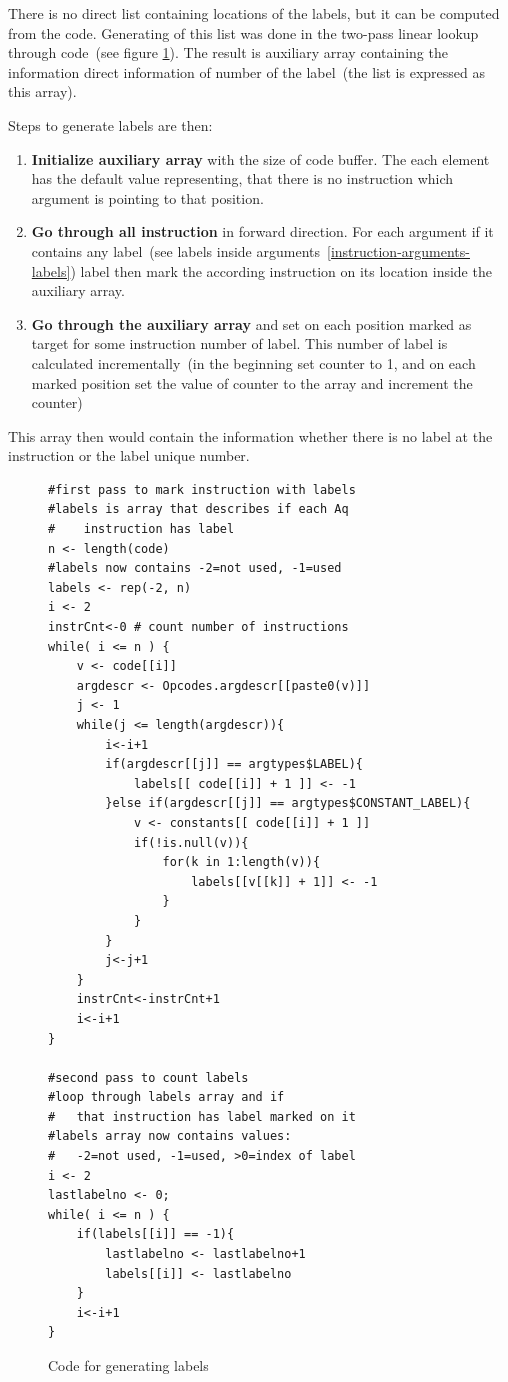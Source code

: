 \documentclass[thesis=M,english]{FITthesis}[2018/10/20]
\begin{document}
There is no direct list containing locations of the labels, but it can be computed from the code. Generating of this list was done in the two-pass linear lookup through code~(see figure \ref{fig:code-generating-labels}). The result is auxiliary array containing the information direct information of number of the label~(the list is expressed as this array).

Steps to generate labels are then:
\begin{enumerate}
	\item \textbf{Initialize auxiliary array} with the size of code buffer. The each element has the default value representing, that there is no instruction which argument is pointing to that position.
	\item \textbf{Go through all instruction} in forward direction. For each argument if it contains any label~(see labels inside arguments~\ref{instruction-arguments-labels}) label then mark the according instruction on its location inside the auxiliary array.
	\item \textbf{Go through the auxiliary array} and set on each position marked as target for some instruction number of label. This number of label is calculated incrementally~(in the beginning set counter to 1, and on each marked position set the value of counter to the array and increment the counter)
\end{enumerate}

This array then would contain the information whether there is no label at the instruction or the label unique number.

\begin{figure}[!h]
\begin{lstlisting}
#first pass to mark instruction with labels
#labels is array that describes if each	Aq
#    instruction has label
n <- length(code)
#labels now contains -2=not used, -1=used
labels <- rep(-2, n)
i <- 2
instrCnt<-0 # count number of instructions
while( i <= n ) {
    v <- code[[i]]
    argdescr <- Opcodes.argdescr[[paste0(v)]]
    j <- 1
    while(j <= length(argdescr)){
        i<-i+1
        if(argdescr[[j]] == argtypes$LABEL){
            labels[[ code[[i]] + 1 ]] <- -1
        }else if(argdescr[[j]] == argtypes$CONSTANT_LABEL){
            v <- constants[[ code[[i]] + 1 ]]
            if(!is.null(v)){
                for(k in 1:length(v)){
                    labels[[v[[k]] + 1]] <- -1
                }
            }
        }
        j<-j+1
    }
    instrCnt<-instrCnt+1
    i<-i+1
}

#second pass to count labels
#loop through labels array and if
#   that instruction has label marked on it
#labels array now contains values:
#   -2=not used, -1=used, >0=index of label
i <- 2
lastlabelno <- 0;
while( i <= n ) {
    if(labels[[i]] == -1){
        lastlabelno <- lastlabelno+1
        labels[[i]] <- lastlabelno
    }
    i<-i+1
}
\end{lstlisting}
	\caption{Code for generating labels}\label{fig:code-generating-labels}
\end{figure}
\end{document}
